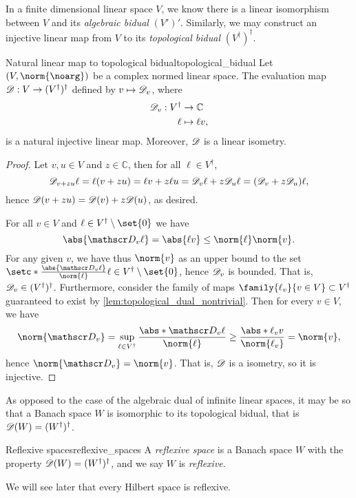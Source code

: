 In a finite dimensional linear space \(V\), we know there is a linear isomorphism between \(V\) and its \emph{algebraic bidual} \((V')'\). Similarly, we may construct an injective linear map from \(V\) to its \emph{topological bidual} \((V^\dag)^\dag\).
\begin{proposition}{Natural linear map to topological bidual}{topological_bidual}
    Let \((V, \norm{\noarg})\) be a complex normed linear space. The evaluation map \(\mathscr{D} : V \to (V^\dag)^\dag\) defined by \(v\mapsto \mathscr{D}_v\), where
    \begin{align*}
        \mathscr{D}_v : V^\dag &\to \mathbb{C}\\
                          \ell &\mapsto \ell v,
    \end{align*}
    is a natural injective linear map. Moreover, \(\mathscr{D}\) is a linear isometry.
\end{proposition}
\begin{proof}
    Let \(v, u \in V\) and \(z \in \mathbb{C}\), then for all \(\ell \in V^\dag\),
    \begin{equation*}
        \mathscr{D}_{v + zu}\ell = \ell(v + zu) = \ell v + z \ell u = \mathscr{D}_v \ell + z \mathscr{D}_{u} \ell = (\mathscr{D}_v + z \mathscr{D}_u) \ell,
    \end{equation*}
    hence \(\mathscr{D}(v + zu) = \mathscr{D}(v) + z\mathscr{D}(u)\), as desired.

    For all \(v \in V\) and \(\ell \in V^\dag \setminus\set{0}\) we have
    \begin{equation*}
        \abs{\eval_v\ell} = \abs{\ell v} \leq \norm{\ell} \norm{v}.
    \end{equation*}
    For any given \(v\), we have thus \(\norm{v}\) as an upper bound to the set \(\setc*{\frac{\abs{\eval_v\ell}}{\norm{\ell}}}{\ell \in V^\dag\setminus\set{0}}\), hence \(\mathscr{D}_v\) is bounded. That is, \(\mathscr{D}_v \in (V^\dag)^\dag\). Furthermore, consider the family of maps \(\family{\ell_v}{v \in V} \subset V^\dag\) guaranteed to exist by \cref{lem:topological_dual_nontrivial}. Then for every \(v \in V\), we have
    \begin{equation*}
        \norm{\eval_v} = \sup_{\ell \in V^\dag} \frac{\abs*{\eval_v\ell}}{\norm{\ell}} \geq \frac{\abs*{\ell_vv}}{\norm{\ell_v}} = \norm{v},
    \end{equation*}
    hence \(\norm{\eval_v} = \norm{v}\). That is, \(\mathscr{D}\) is a isometry, so it is injective.
\end{proof}



As opposed to the case of the algebraic dual of infinite linear spaces, it may be so that a Banach space \(W\) is isomorphic to its topological bidual, that is \(\mathscr{D}(W) = (W^\dag)^\dag\).
\begin{definition}{Reflexive spaces}{reflexive_spaces}
    A \emph{reflexive space} is a Banach space \(W\) with the property \(\mathscr{D}(W) = (W^\dag)^\dag\), and we say \(W\) is \emph{reflexive}.
\end{definition}
\begin{remark}
    We will see later that every Hilbert space is reflexive.
\end{remark}

